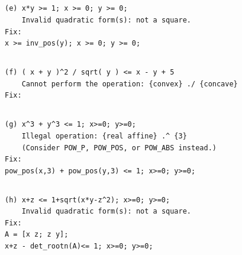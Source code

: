 \documentclass{article}
\begin{document}
\subsection{}
\begin{verbatim}
(e) x*y >= 1; x >= 0; y >= 0;
    Invalid quadratic form(s): not a square.
Fix:
x >= inv_pos(y); x >= 0; y >= 0;
\end{verbatim}

\subsection{}
\begin{verbatim}
(f) ( x + y )^2 / sqrt( y ) <= x - y + 5
    Cannot perform the operation: {convex} ./ {concave}
Fix:

\end{verbatim}

\subsection{}
\begin{verbatim}
(g) x^3 + y^3 <= 1; x>=0; y>=0;
    Illegal operation: {real affine} .^ {3}
    (Consider POW_P, POW_POS, or POW_ABS instead.)
Fix:
pow_pos(x,3) + pow_pos(y,3) <= 1; x>=0; y>=0;
\end{verbatim}

\subsection{}
\begin{verbatim}
(h) x+z <= 1+sqrt(x*y-z^2); x>=0; y>=0;
    Invalid quadratic form(s): not a square.
Fix:
A = [x z; z y];
x+z - det_rootn(A)<= 1; x>=0; y>=0;
\end{verbatim}




% 
% 
\end{document}
